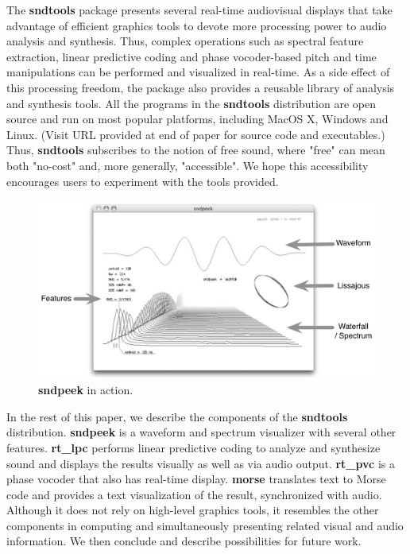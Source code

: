 \documentclass{article}
\begin{document}
The {\bf sndtools} package presents several real-time audiovisual displays that take advantage of efficient graphics tools 
to devote more processing power to audio analysis and synthesis. Thus, complex operations such as spectral feature 
extraction, linear predictive coding and phase vocoder-based pitch and time manipulations can be performed and 
visualized in real-time. As a side effect of this processing freedom, the package also provides a reusable library 
of analysis and synthesis tools. 
\sloppy
All the programs in the {\bf sndtools} distribution are open source and run on most popular platforms, including MacOS X, 
Windows and Linux. (Visit URL provided at end of paper for source code and executables.) Thus, {\bf sndtools} subscribes to 
the notion of free sound, where "free" can mean both "no-cost" 
and, more generally, "accessible". We hope this accessibility encourages users to experiment with the tools provided. 

\begin{figure}
\center
\includegraphics[width=\textwidth]{sndpeek_bw}
\caption{{\bf sndpeek} in action.}
\label{fig:f_sndpeek}
\end{figure}

In the rest of this paper, we describe the components of the {\bf sndtools} distribution. {\bf sndpeek} is a waveform and 
spectrum visualizer with several other features. {\bf rt\_lpc} performs linear predictive coding to analyze and 
synthesize sound and displays the results visually as well as via audio output. {\bf rt\_pvc} is a phase vocoder that also has 
real-time display.
{\bf morse} translates text to Morse code and provides a text visualization of the result, synchronized with audio. Although it does not rely on high-level graphics tools, it resembles the other components in computing and simultaneously presenting related visual and audio information. 
We then conclude and describe possibilities for future work.
\end{document}
